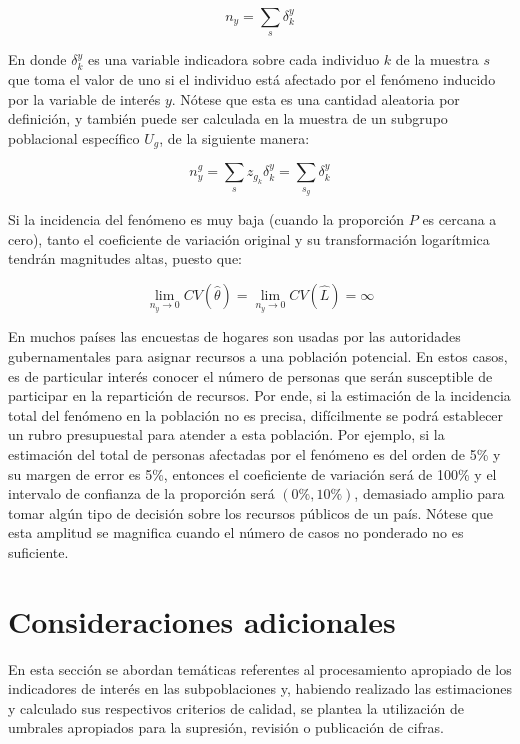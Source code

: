 \documentclass[
  12pt,
  spanish,
]{book}
\begin{document}
\[
n_y = \sum_{s}\delta_{k}^y
\]

En donde \(\delta_{k}^y\) es una variable indicadora sobre cada individuo \(k\) de la muestra \(s\) que toma el valor de uno si el individuo está afectado por el fenómeno inducido por la variable de interés \(y\). Nótese que esta es una cantidad aleatoria por definición, y también puede ser calculada en la muestra de un subgrupo poblacional específico \(U_g\), de la siguiente manera:

\[
n_y^g = \sum_{s}z_{g_k}\delta_{k}^y = \sum_{s_g}\delta_{k}^y
\]

Si la incidencia del fenómeno es muy baja (cuando la proporción \(P\) es cercana a cero), tanto el coeficiente de variación original y su transformación logarítmica tendrán magnitudes altas, puesto que:

\[
\lim_{n_y \rightarrow 0} CV(\hat \theta) = 
\lim_{n_y \rightarrow 0} CV(\hat L) = \infty
\]

En muchos países las encuestas de hogares son usadas por las autoridades gubernamentales para asignar recursos a una población potencial. En estos casos, es de particular interés conocer el número de personas que serán susceptible de participar en la repartición de recursos. Por ende, si la estimación de la incidencia total del fenómeno en la población no es precisa, difícilmente se podrá establecer un rubro presupuestal para atender a esta población. Por ejemplo, si la estimación del total de personas afectadas por el fenómeno es del orden de 5\% y su margen de error es 5\%, entonces el coeficiente de variación será de 100\% y el intervalo de confianza de la proporción será \((0 \%, 10 \%)\), demasiado amplio para tomar algún tipo de decisión sobre los recursos públicos de un país. Nótese que esta amplitud se magnifica cuando el número de casos no ponderado no es suficiente.

\hypertarget{consideraciones-adicionales-1}{%
\section{Consideraciones adicionales}\label{consideraciones-adicionales-1}}

En esta sección se abordan temáticas referentes al procesamiento apropiado de los indicadores de interés en las subpoblaciones y, habiendo realizado las estimaciones y calculado sus respectivos criterios de calidad, se plantea la utilización de umbrales apropiados para la supresión, revisión o publicación de cifras.
\end{document}
